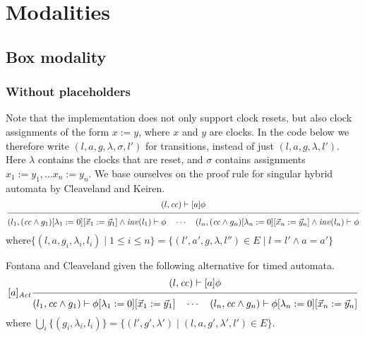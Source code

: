 \documentclass{article}
\newcommand{\proofrule}[3][]{#1 \frac{\raisebox{.7ex}{\normalsize{$#2$}}}
  {\raisebox{-1.0ex}{\normalsize{$#3$}}}}
\newcommand{\loc}{l}
\newcommand{\region}{\mathit{cc}}
\newcommand{\inv}{\mathit{inv}}
\begin{document}
\section{Modalities}

\subsection{Box modality}

\subsubsection{Without placeholders}

Note that the implementation does not only support clock resets, but also clock assignments of the form $x := y$, where $x$ and $y$ are clocks. In the code below we therefore write $(\loc, a, g, \lambda, \sigma, \loc')$ for transitions, instead of just $(\loc, a, g, \lambda, \loc')$. Here $\lambda$ contains the clocks that are reset, and $\sigma$ contains assignments $x_1 := y_1, \ldots x_n := y_n$.
We base ourselves on the proof rule for singular hybrid automata by Cleaveland and Keiren.
\[
\proofrule
{(\loc, \region) \vdash [a] \phi}
{(\loc_1, (\region \land g_1)[\lambda_1 := 0][\vec{x}_1 := \vec{y}_1] \land \inv(\loc_1) \vdash \phi
\quad
\cdots
\quad
(\loc_n, (\region \land g_n)[\lambda_n := 0][\vec{x}_n := \vec{y}_n] \land \inv(\loc_n) \vdash \phi
}
\]
where$ \{(\loc,a,g_i,\lambda_i,\loc_i) \mid 1 \leq i \leq n \} = \{ (l', a', g, \lambda, l'') \in E \mid l = l' \land a = a' \}$

Fontana and Cleaveland \cite{FC:14report} given the following alternative for timed automata.
\[
\proofrule[{[a]_{\mathit{Act}}}]
{(\loc, \region) \vdash [a]\phi}
{(\loc_1, \region \land g_1) \vdash \phi{[\lambda_1 := 0][\vec{x}_1 := \vec{y}_1]}
\quad \cdots \quad
(\loc_n, \region \land g_n) \vdash \phi{[\lambda_n := 0][\vec{x}_n := \vec{y}_n]}
}
\]
where $\bigcup_i \{ (g_i,\lambda_i,\loc_i) \} = \{ (\loc', g', \lambda') \mid (\loc, a, g', \lambda', \loc') \in E \}$.
\end{document}
